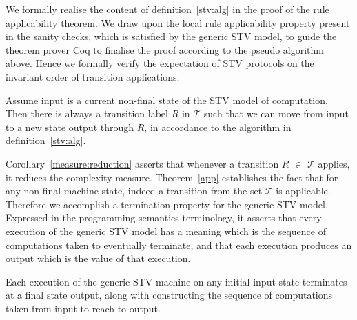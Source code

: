 \documentclass{llncs}
\begin{document}
 We formally realise the content of definition~\ref{stv:alg} in the proof of the rule  applicability theorem.  We draw upon the local rule applicability property present in the sanity checks, which is satisfied by the generic STV model, to guide the theorem prover Coq to finalise the proof according to the pseudo algorithm above. Hence we formally verify the expectation of STV protocols on the invariant order of transition applications.
\begin{theorem}\label{app}
Assume \textsf{input} is a current non-final state of the STV model of computation. Then there is always a transition label  $R$ in $\mathcal{T}$ such that we can move from \textsf{input} to a new state \textsf{output} through $R$, in accordance to the algorithm in definition~\ref{stv:alg}. 
\end{theorem}
Corollary~\ref{measure:reduction} asserts that whenever a transition $R$ $\in$ $\mathcal{T}$ applies, it reduces the complexity measure. Theorem~\ref{app} establishes the fact that for any non-final machine state, indeed a transition from the set $\mathcal{T}$ is applicable. Therefore we accomplish a termination property for the generic STV model. Expressed in the programming semantics terminology, it asserts that every execution of the generic STV model has a meaning which is the sequence of computations taken to eventually terminate, and that each execution produces an output which is the value of that execution. 
\begin{theorem}[Termination]\label{termination}
Each execution of the generic STV machine on any initial \textsf{input} state terminates at a final state \textsf{output}, along with constructing the sequence of computations taken from \textsf{input} to reach to \textsf{output}. 
\end{theorem}   
\end{document}
